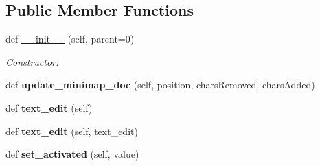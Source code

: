 \subsection*{Public Member Functions}
\begin{DoxyCompactItemize}
\item 
def \hyperlink{classplume-creator_1_1src_1_1plume_1_1gui_1_1writingzone_1_1minimap__text__browser_1_1_minimap2_a53da0fc20d31e78ce29a357ca70e48d8}{\+\_\+\+\_\+init\+\_\+\+\_\+} (self, parent=0)\hypertarget{classplume-creator_1_1src_1_1plume_1_1gui_1_1writingzone_1_1minimap__text__browser_1_1_minimap2_a53da0fc20d31e78ce29a357ca70e48d8}{}\label{classplume-creator_1_1src_1_1plume_1_1gui_1_1writingzone_1_1minimap__text__browser_1_1_minimap2_a53da0fc20d31e78ce29a357ca70e48d8}

\begin{DoxyCompactList}\small\item\em Constructor. \end{DoxyCompactList}\item 
def {\bfseries update\+\_\+minimap\+\_\+doc} (self, position, chars\+Removed, chars\+Added)\hypertarget{classplume-creator_1_1src_1_1plume_1_1gui_1_1writingzone_1_1minimap__text__browser_1_1_minimap2_add473be333525cebe06496004835afb7}{}\label{classplume-creator_1_1src_1_1plume_1_1gui_1_1writingzone_1_1minimap__text__browser_1_1_minimap2_add473be333525cebe06496004835afb7}

\item 
def {\bfseries text\+\_\+edit} (self)\hypertarget{classplume-creator_1_1src_1_1plume_1_1gui_1_1writingzone_1_1minimap__text__browser_1_1_minimap2_a95638cff19643b5c554e4f8f96ac737a}{}\label{classplume-creator_1_1src_1_1plume_1_1gui_1_1writingzone_1_1minimap__text__browser_1_1_minimap2_a95638cff19643b5c554e4f8f96ac737a}

\item 
def {\bfseries text\+\_\+edit} (self, text\+\_\+edit)\hypertarget{classplume-creator_1_1src_1_1plume_1_1gui_1_1writingzone_1_1minimap__text__browser_1_1_minimap2_ab001fe1aabdde7d5e4852a5976a8ad78}{}\label{classplume-creator_1_1src_1_1plume_1_1gui_1_1writingzone_1_1minimap__text__browser_1_1_minimap2_ab001fe1aabdde7d5e4852a5976a8ad78}

\item 
def {\bfseries set\+\_\+activated} (self, value)\hypertarget{classplume-creator_1_1src_1_1plume_1_1gui_1_1writingzone_1_1minimap__text__browser_1_1_minimap2_ad514bc3b9143ea4f231f247e20b3513e}{}\label{classplume-creator_1_1src_1_1plume_1_1gui_1_1writingzone_1_1minimap__text__browser_1_1_minimap2_ad514bc3b9143ea4f231f247e20b3513e}


\end{DoxyCompactItemize}
